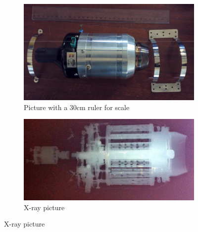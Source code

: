 \documentclass[tcc]{subfiles}
\begin{document}
\begin{figure}[p]
    \centering
    \caption{JetsMunt VT-80 jet engine}
    \label{fig:engine}
    \begin{subfigure}{\textwidth}
        \includegraphics[width=\textwidth]{fig/JetsMuntVT-80.jpg}
        \caption{Picture with a 30cm ruler for scale}
        \label{fig:engine!visible}
    \end{subfigure}
    \begin{subfigure}{\textwidth}
        \includegraphics[width=\textwidth]{fig/JetsMuntVT-80X-ray.jpg}
        \caption{X-ray picture}
        \label{fig:engine!x-ray}
    \end{subfigure}
\end{figure}
\end{document}
